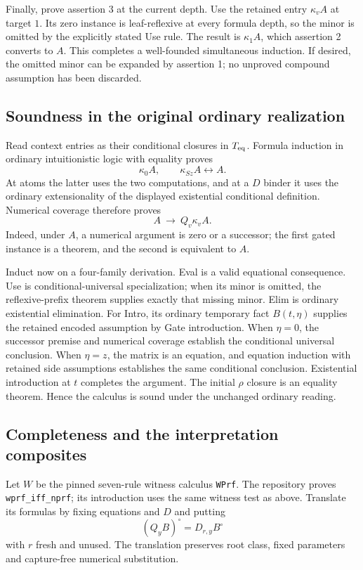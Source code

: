 Finally, prove assertion 3 at the current depth.  Use the retained entry
$\kappa_vA$ at target $1$.  Its zero instance is leaf-reflexive at every
formula depth, so the minor is omitted by the explicitly stated Use
rule.  The result is $\kappa_1A$, which assertion 2 converts to $A$.
This completes a well-founded simultaneous induction.  If desired, the
omitted minor can be expanded by assertion 1; no unproved compound
assumption has been discarded.

\subsection{Soundness in the original ordinary realization}

Read context entries as their conditional closures in $T_{\rm eq}$.
Formula induction in ordinary intuitionistic logic with equality proves
\[
 \kappa_0A,\qquad \kappa_{Sz}A\leftrightarrow A.
\]
At atoms the latter uses the two computations, and at a $D$ binder it
uses the ordinary extensionality of the displayed existential conditional
definition.  Numerical coverage therefore proves
\[
 A\ \longrightarrow\ Q_v\kappa_vA.
 \tag{Gate introduction}
\]
Indeed, under $A$, a numerical argument is zero or a successor; the
first gated instance is a theorem, and the second is equivalent to $A$.

Induct now on a four-family derivation.  Eval is a valid equational
consequence.  Use is conditional-universal specialization; when its
minor is omitted, the reflexive-prefix theorem supplies exactly that
missing minor.  Elim is ordinary existential elimination.  For Intro, its
ordinary temporary fact $B(t,\eta)$ supplies the retained encoded
assumption by Gate introduction.  When $\eta=0$, the successor premise
and numerical coverage establish the conditional universal conclusion.
When $\eta=z$, the matrix is an equation, and equation induction with
retained side assumptions establishes the same conditional conclusion.
Existential introduction at $t$ completes the argument.  The initial
$\rho$ closure is an equality theorem.  Hence the calculus is sound
under the unchanged ordinary reading.

\subsection{Completeness and the interpretation composites}

Let $W$ be the pinned seven-rule witness calculus \texttt{WPrf}.  The
repository proves \texttt{wprf\_iff\_nprf}; its introduction uses the
same witness test as above.  Translate its formulas by fixing equations
and $D$ and putting
\[
 (Q_yB)^\circ=D_{r,y}B^\circ
\]
with $r$ fresh and unused.  The translation preserves root class, fixed
parameters and capture-free numerical substitution.

